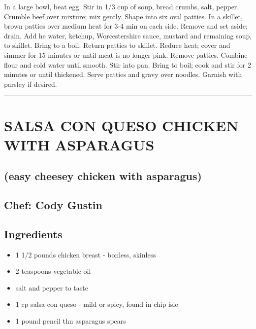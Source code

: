 \documentclass[
]{book}
\providecommand{\tightlist}{%
  \setlength{\itemsep}{0pt}\setlength{\parskip}{0pt}}
\begin{document}
In a large bowl, beat egg. Stir in 1/3 cup of soup, bread crumbs, salt, pepper. Crumble beef over mixture; mix gently. Shape into six oval patties. In a skillet, brown patties over medium heat for 3-4 min on each side. Remove and set aside; drain. Add he water, ketchup, Worcestershire sauce, mustard and remaining soup, to skillet. Bring to a boil. Return patties to skillet. Reduce heat; cover and simmer for 15 minutes or until meat is no longer pink. Remove patties. Combine flour and cold water until smooth. Stir into pan. Bring to boil; cook and stir for 2 minutes or until thickened. Serve patties and gravy over noodles. Garnish with parsley if desired.

\begin{center}\rule{0.5\linewidth}{0.5pt}\end{center}

\hypertarget{salsa-con-queso-chicken-with-asparagus}{%
\section*{SALSA CON QUESO CHICKEN WITH ASPARAGUS}\label{salsa-con-queso-chicken-with-asparagus}}


\hypertarget{easy-cheesey-chicken-with-asparagus}{%
\subsection*{(easy cheesey chicken with asparagus)}\label{easy-cheesey-chicken-with-asparagus}}


\hypertarget{chef-cody-gustin}{%
\subsection*{Chef: Cody Gustin}\label{chef-cody-gustin}}


\hypertarget{ingredients-64}{%
\subsection*{Ingredients}\label{ingredients-64}}


\begin{itemize}
\tightlist
\item
  1 1/2 pounds chicken breast - bonless, skinless
\item
  2 teaspoons vegetable oil
\item
  salt and pepper to taste
\item
  1 cp salsa con queso - mild or spicy, found in chip isle
\item
  1 pound pencil thn asparagus spears
\end{itemize}
\end{document}
